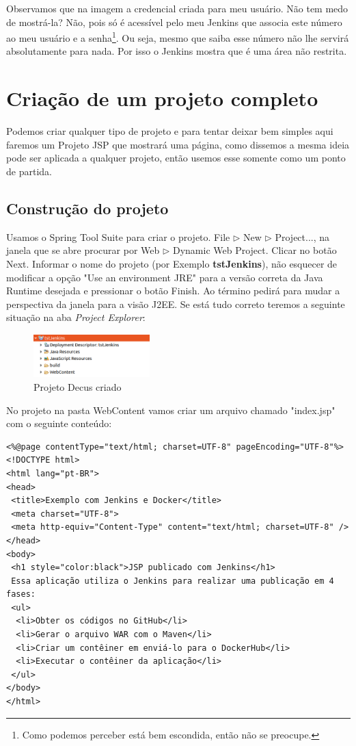 \documentclass[a4paper,11pt]{article}
\begin{document}
Observamos que na imagem a credencial criada para meu usuário. Não tem medo de mostrá-la? Não, pois só é acessível pelo meu Jenkins que associa este número ao meu usuário e a senha\footnote{Como podemos perceber está bem escondida, então não se preocupe.}. Ou seja, mesmo que saiba esse número não lhe servirá absolutamente para nada. Por isso o Jenkins mostra que é uma área não restrita.

\section{Criação de um projeto completo}
Podemos criar qualquer tipo de projeto e para tentar deixar bem simples aqui faremos um Projeto JSP que mostrará uma página, como dissemos a mesma ideia pode ser aplicada a qualquer projeto, então usemos esse somente como um ponto de partida.

\subsection{Construção do projeto}
Usamos o Spring Tool Suite\cite{sts} para criar o projeto. File $\triangleright$ New $\triangleright$ Project..., na janela que se abre procurar por Web $\triangleright$ Dynamic Web Project. Clicar no botão Next. Informar o nome do projeto (por Exemplo \textbf{tstJenkins}), não esquecer de modificar a opção "Use an environment JRE" para a versão correta da Java Runtime desejada e pressionar o botão Finish. Ao término pedirá para mudar a perspectiva da janela para a visão J2EE. Se está tudo correto teremos a seguinte situação na aba \textit{Project Explorer}:
\begin{figure}[H]
	\centering
	\includegraphics[width=0.4\textwidth]{imagens/projetoCriado.png}
	\caption{Projeto Decus criado}
\end{figure}

No projeto na pasta WebContent vamos criar um arquivo chamado "index.jsp" com o seguinte conteúdo:
\begin{lstlisting}
<%@page contentType="text/html; charset=UTF-8" pageEncoding="UTF-8"%>
<!DOCTYPE html>
<html lang="pt-BR">
<head>
 <title>Exemplo com Jenkins e Docker</title>
 <meta charset="UTF-8">
 <meta http-equiv="Content-Type" content="text/html; charset=UTF-8" />
</head>
<body>
 <h1 style="color:black">JSP publicado com Jenkins</h1>
 Essa aplicação utiliza o Jenkins para realizar uma publicação em 4 fases:
 <ul>
  <li>Obter os códigos no GitHub</li>
  <li>Gerar o arquivo WAR com o Maven</li>
  <li>Criar um contêiner em enviá-lo para o DockerHub</li>
  <li>Executar o contêiner da aplicação</li>
 </ul>
</body>
</html>
\end{lstlisting}
\end{document}
